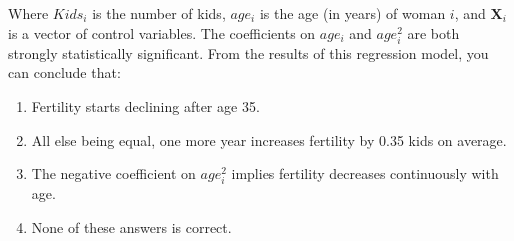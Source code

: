 \documentclass{article}
\begin{document}
\begin{enumerate}
Where $Kids_i$ is the number of kids, $age_i$ is the age (in years) of woman $i$, and $\textbf{X}_{i}$ is a vector of control variables. The coefficients on $age_i$ and $age_i^2$ are both strongly statistically significant. From the results of this regression model, you can conclude that:

\begin{enumerate}[label=\alph*)]
\item Fertility starts declining after age 35.
\item All else being equal, one more year increases fertility by 0.35 kids on average.
\item The negative coefficient on  $age_i^2$ implies fertility decreases continuously with age.
\item None of these answers is correct.
\end{enumerate}\vspace{.25cm}



\end{enumerate}


\newpage
{}\\[2em]
\end{document}

